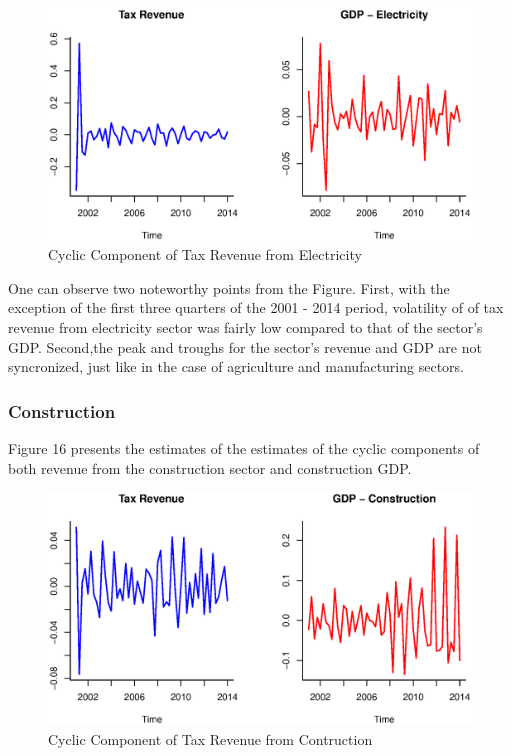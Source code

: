 \documentclass[12pt,a4paper,final]{article}
\begin{document}
\begin{figure}[h]
\centering
\begin{small}
\caption{Cyclic Component of Tax Revenue from Electricity}
\end{small}
\includegraphics[scale=0.601]{electric.eps} 
\end{figure}

One can observe two noteworthy points from the Figure. First, with the exception of the first three quarters of the 2001 - 2014 period, volatility of of tax revenue from electricity sector was fairly low compared to that of the sector's GDP. Second,the peak and troughs for the sector's revenue and GDP are not syncronized, just like in the case of agriculture and manufacturing sectors.


\subsubsection{Construction}

Figure 16 presents the estimates of the estimates of the cyclic components of both revenue from the construction sector and construction GDP.

\begin{figure}[h]
\centering
\begin{small}
\caption{Cyclic Component of Tax Revenue from Contruction}
\end{small}
\includegraphics[scale=0.601]{construct.eps} 
\end{figure}
\end{document}
